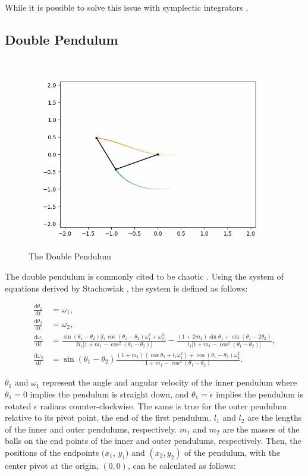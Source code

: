 \documentclass{article}
\newcommand{\der}[2][t]{\frac{\mathrm{d}#2}{\mathrm{d}#1}}
\begin{document}
While it is possible to solve this issue with symplectic integrators \cite{chambers1999hybrid}, 

\subsection{Double Pendulum}

\begin{figure}[h]
    \centering
    \includegraphics[width=.5\linewidth]{images/example_doub_pend.png}
    \caption{The Double Pendulum}
    \label{fig:doub_pend}
\end{figure}


The double pendulum is commonly cited to be chaotic 
\cite{stachowiak2006numerical} \cite{levien1993double}. Using the system 
of equations derived by Stachowiak \cite{stachowiak2006numerical}, the system is
defined as follows:

\begin{align}
    \der{\theta_1} &= \omega_1, \nonumber \\
    \der{\theta_2} &= \omega_2, \nonumber \\
    \der{\omega_1} &= 
    \frac{
        \sin(\theta_1 - \theta_2) \lbrack
            l_1 \cos(\theta_1 - \theta_2) \omega_1^2 + \omega_2^2
        \rbrack
    }{
        2 l_1 \lbrack
            1 + m_1 - \cos^2(\theta_1 - \theta_2)
        \rbrack
    }
    -
    \frac{
        (1 + 2 m_1) \sin \theta_1 + \sin(\theta_1 - 2 \theta_2)
    }{
        l_1 \lbrack
            1 + m_1 - \cos^2(\theta_1 - \theta_2)
        \rbrack
    }
    , \nonumber \\
    \der{\omega_2} &= \sin (\theta_1 - \theta_2) 
    \frac{
        (1+m_1) (\cos \theta_1 + l_1 \omega_1^2)
        +
        \cos(\theta_1 - \theta_2) \omega_2^2
    }{
        1 + m_1 - \cos^2(\theta_1 - \theta_2)
    }. \label{eq:doub_pen}
\end{align}

$\theta_1$ and $\omega_1$ represent the angle and angular velocity of the inner pendulum 
where $\theta_1=0$ implies the pendulum is straight down, and $\theta_1=\epsilon$ implies 
the pendulum is rotated $\epsilon$ radians counter-clockwise. The same is true for the 
outer pendulum relative to its pivot point, the end of the first pendulum. $l_1$ and $l_2$ 
are the lengths of the inner and outer pendulums, respectively. $m_1$ and $m_2$ are the 
masses of the balls on the end points of the inner and outer pendulums, respectively.
Then, the positions of the endpoints $(x_1$, $y_1)$ and $(x_2, y_2)$ of the pendulum, with 
the center pivot at the origin, $(0, 0)$, can be calculated as follows:
\end{document}
